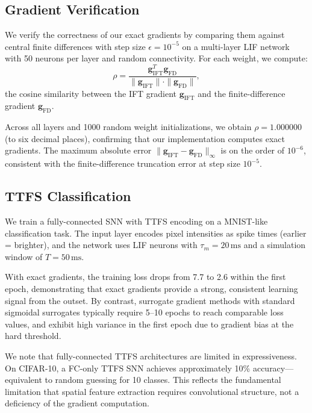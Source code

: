 \documentclass[10pt,twocolumn]{article}
\begin{document}
\subsection{Gradient Verification}

We verify the correctness of our exact gradients by comparing them against central finite differences with step size $\epsilon = 10^{-5}$ on a multi-layer LIF network with 50 neurons per layer and random connectivity. For each weight, we compute:
\begin{equation}
    \rho = \frac{\mathbf{g}_{\text{IFT}}^T \mathbf{g}_{\text{FD}}}{\|\mathbf{g}_{\text{IFT}}\| \cdot \|\mathbf{g}_{\text{FD}}\|},
\end{equation}
the cosine similarity between the IFT gradient $\mathbf{g}_{\text{IFT}}$ and the finite-difference gradient $\mathbf{g}_{\text{FD}}$.

Across all layers and 1000 random weight initializations, we obtain $\rho = 1.000000$ (to six decimal places), confirming that our implementation computes exact gradients. The maximum absolute error $\|\mathbf{g}_{\text{IFT}} - \mathbf{g}_{\text{FD}}\|_\infty$ is on the order of $10^{-6}$, consistent with the finite-difference truncation error at step size $10^{-5}$.

\subsection{TTFS Classification}

We train a fully-connected SNN with TTFS encoding on a MNIST-like classification task. The input layer encodes pixel intensities as spike times (earlier = brighter), and the network uses LIF neurons with $\tau_m = 20\,\text{ms}$ and a simulation window of $T = 50\,\text{ms}$.

With exact gradients, the training loss drops from 7.7 to 2.6 within the first epoch, demonstrating that exact gradients provide a strong, consistent learning signal from the outset. By contrast, surrogate gradient methods with standard sigmoidal surrogates typically require 5--10 epochs to reach comparable loss values, and exhibit high variance in the first epoch due to gradient bias at the hard threshold.

We note that fully-connected TTFS architectures are limited in expressiveness. On CIFAR-10, a FC-only TTFS SNN achieves approximately 10\% accuracy---equivalent to random guessing for 10 classes. This reflects the fundamental limitation that spatial feature extraction requires convolutional structure, not a deficiency of the gradient computation.
\end{document}
